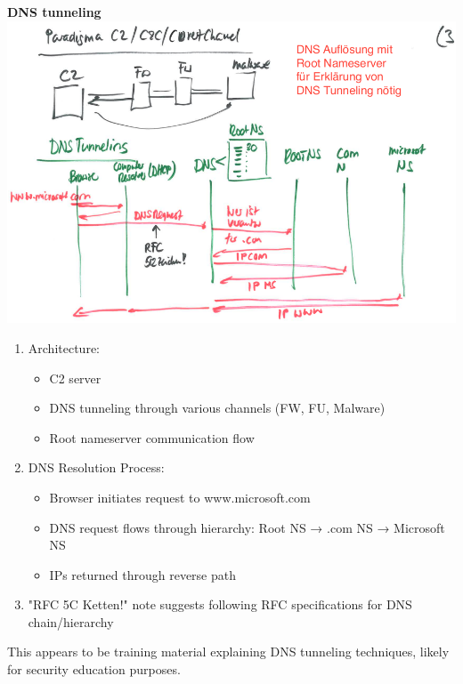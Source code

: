 \textbf{DNS tunneling}
\includegraphics[scale=0.5]{resources/03-covert-channel.png}
\begin{enumerate}
  \item Architecture:
  \begin{itemize}
    \tightlist
		\item C2 server
		\item DNS tunneling through various channels (FW, FU, Malware)
		\item Root nameserver communication flow
  \end{itemize}

  \item DNS Resolution Process:
  \begin{itemize}
    \tightlist
		\item Browser initiates request to www.microsoft.com
		\item DNS request flows through hierarchy: Root NS → .com NS → Microsoft NS
		\item IPs returned through reverse path
  \end{itemize}
  \item "RFC 5C Ketten!" note suggests following RFC specifications for DNS chain/hierarchy
\end{enumerate}
This appears to be training material explaining DNS tunneling techniques, likely for security education purposes.

